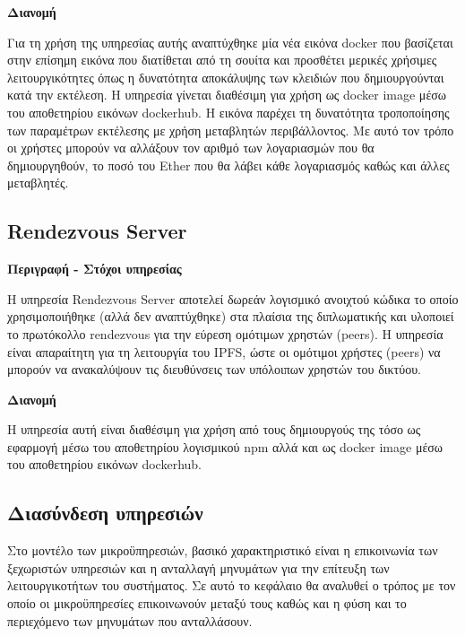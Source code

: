 \vspace{0.5cm}
\textbf{Διανομή}

Για τη χρήση της υπηρεσίας αυτής αναπτύχθηκε μία νέα εικόνα docker που βασίζεται στην επίσημη εικόνα που διατίθεται από τη σουίτα και προσθέτει μερικές χρήσιμες λειτουργικότητες όπως η δυνατότητα αποκάλυψης των κλειδιών που δημιουργούνται κατά την εκτέλεση. Η υπηρεσία γίνεται διαθέσιμη για χρήση ως docker image μέσω του αποθετηρίου εικόνων dockerhub. Η εικόνα παρέχει τη δυνατότητα τροποποίησης των παραμέτρων εκτέλεσης με χρήση μεταβλητών περιβάλλοντος. Με αυτό τον τρόπο οι χρήστες μπορούν να αλλάξουν τον αριθμό των λογαριασμών που θα δημιουργηθούν, το ποσό του Ether που θα λάβει κάθε λογαριασμός καθώς και άλλες μεταβλητές.

\subsection{Rendezvous Server} \label{subsection:4-4-rendezvous-server-service}

\vspace{0.5cm}
\textbf{Περιγραφή - Στόχοι υπηρεσίας}

Η υπηρεσία Rendezvous Server αποτελεί δωρεάν λογισμικό ανοιχτού κώδικα το οποίο χρησιμοποιήθηκε (αλλά δεν αναπτύχθηκε) στα πλαίσια της διπλωματικής και υλοποιεί το πρωτόκολλο rendezvous για την εύρεση ομότιμων χρηστών (peers). Η υπηρεσία είναι απαραίτητη για τη λειτουργία του IPFS, ώστε οι ομότιμοι χρήστες (peers) να μπορούν να ανακαλύψουν τις διευθύνσεις των υπόλοιπων χρηστών του δικτύου.

\vspace{0.5cm}
\textbf{Διανομή}

Η υπηρεσία αυτή είναι διαθέσιμη για χρήση από τους δημιουργούς της τόσο ως εφαρμογή μέσω του αποθετηρίου λογισμικού npm αλλά και ως docker image μέσω του αποθετηρίου εικόνων dockerhub.

\subsection{Διασύνδεση υπηρεσιών} \label{subsection:4-4-service-communication}

Στο μοντέλο των μικροϋπηρεσιών, βασικό χαρακτηριστικό είναι η επικοινωνία των ξεχωριστών υπηρεσιών και η ανταλλαγή μηνυμάτων για την επίτευξη των λειτουργικοτήτων του συστήματος. Σε αυτό το κεφάλαιο θα αναλυθεί ο τρόπος με τον οποίο οι μικροϋπηρεσίες επικοινωνούν μεταξύ τους καθώς και η φύση και το περιεχόμενο των μηνυμάτων που ανταλλάσουν.

